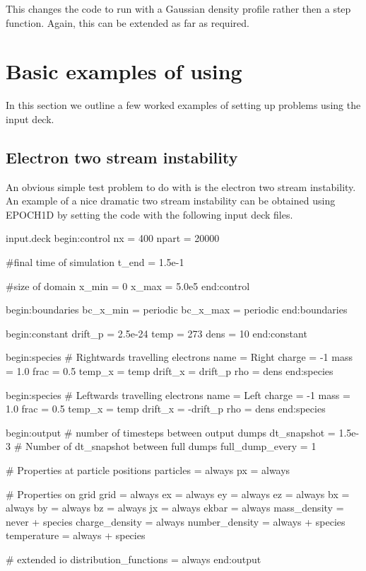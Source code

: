 This changes the code to run with a Gaussian density profile rather then a step
function. Again, this can be extended as far as required.
%

\section{Basic examples of using {\EPOCH}}
\label{sec:examples}

In this section we outline a few worked examples of setting up problems
using the {\EPOCH} input deck.

\subsection{Electron two stream instability}

An obvious simple test problem to do with {\EPOCH} is the electron two stream
instability. An example of a nice dramatic two stream instability can be
obtained using EPOCH1D by setting the code with the following input deck
files.\\
\begin{lboxverbatim}{input.deck}
begin:control
   nx = 400
   npart = 20000

   #final time of simulation
   t_end = 1.5e-1

   #size of domain
   x_min = 0
   x_max = 5.0e5
end:control


begin:boundaries
   bc_x_min = periodic
   bc_x_max = periodic
end:boundaries


begin:constant
   drift_p = 2.5e-24
   temp = 273
   dens = 10
end:constant


begin:species
   # Rightwards travelling electrons
   name = Right
   charge = -1
   mass = 1.0
   frac = 0.5
   temp_x = temp
   drift_x = drift_p
   rho = dens
end:species


begin:species
   # Leftwards travelling electrons
   name = Left
   charge = -1
   mass = 1.0
   frac = 0.5
   temp_x = temp
   drift_x = -drift_p
   rho = dens
end:species


begin:output
   # number of timesteps between output dumps
   dt_snapshot = 1.5e-3
   # Number of dt_snapshot between full dumps
   full_dump_every = 1

   # Properties at particle positions
   particles = always
   px = always

   # Properties on grid
   grid = always
   ex = always
   ey = always
   ez = always
   bx = always
   by = always
   bz = always
   jx = always
   ekbar = always
   mass_density = never + species
   charge_density = always
   number_density = always + species
   temperature = always + species

   # extended io
   distribution_functions = always
end:output
\end{lboxverbatim}

